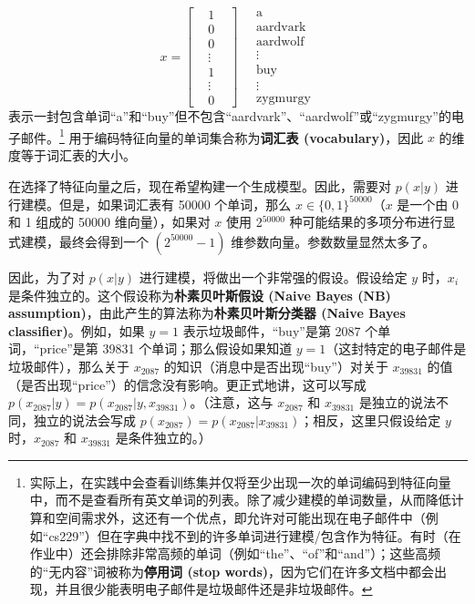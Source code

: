 \[
x = 
\begin{bmatrix}
    &1& \\
    &0& \\
    &0& \\
    &\vdots& \\
    &1& \\
    &\vdots& \\
    &0&
\end{bmatrix}
\quad %
\begin{array}{l}
    \text{a} \\
    \text{aardvark} \\
    \text{aardwolf} \\
    \vdots \\
    \text{buy} \\
    \vdots \\
    \text{zygmurgy}
\end{array}
\]
表示一封包含单词“a”和“buy”但不包含“aardvark”、“aardwolf”或“zygmurgy”的电子邮件。\footnote{实际上，在实践中会查看训练集并仅将至少出现一次的单词编码到特征向量中，而不是查看所有英文单词的列表。除了减少建模的单词数量，从而降低计算和空间需求外，这还有一个优点，即允许对可能出现在电子邮件中（例如“cs229”）但在字典中找不到的许多单词进行建模/包含作为特征。有时（在作业中）还会排除非常高频的单词（例如“the”、“of”和“and”）；这些高频的“无内容”词被称为\textbf{停用词 (stop words)}，因为它们在许多文档中都会出现，并且很少能表明电子邮件是垃圾邮件还是非垃圾邮件。} 用于编码特征向量的单词集合称为\textbf{词汇表 (vocabulary)}，因此 $x$ 的维度等于词汇表的大小。

在选择了特征向量之后，现在希望构建一个生成模型。因此，需要对 $p(x|y)$ 进行建模。但是，如果词汇表有 50000 个单词，那么 $x \in \{0, 1\}^{50000}$（$x$ 是一个由 0 和 1 组成的 50000 维向量），如果对 $x$ 使用 2$^{50000}$ 种可能结果的多项分布进行显式建模，最终会得到一个 $(2^{50000}-1)$ 维参数向量。参数数量显然太多了。

因此，为了对 $p(x|y)$ 进行建模，将做出一个非常强的假设。假设给定 $y$ 时，$x_i$ 是条件独立的。这个假设称为\textbf{朴素贝叶斯假设 (Naive Bayes (NB) assumption)}，由此产生的算法称为\textbf{朴素贝叶斯分类器 (Naive Bayes classifier)}。例如，如果 $y=1$ 表示垃圾邮件，“buy”是第 2087 个单词，“price”是第 39831 个单词；那么假设如果知道 $y=1$（这封特定的电子邮件是垃圾邮件），那么关于 $x_{2087}$ 的知识（消息中是否出现“buy”）对关于 $x_{39831}$ 的值（是否出现“price”）的信念没有影响。更正式地讲，这可以写成 $p(x_{2087}|y) = p(x_{2087}|y, x_{39831})$。（注意，这与 $x_{2087}$ 和 $x_{39831}$ 是独立的说法不同，独立的说法会写成 $p(x_{2087}) = p(x_{2087}|x_{39831})$；相反，这里只假设给定 $y$ 时，$x_{2087}$ 和 $x_{39831}$ 是条件独立的。）

